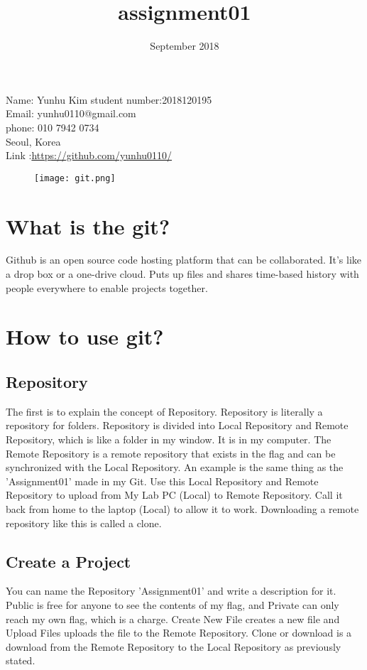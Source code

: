 \documentclass{article}
\title{assignment01}
\date{September 2018}
\begin{document}
	
	\maketitle
	Name: Yunhu Kim  student number:2018120195\\
	Email: yunhu0110@gmail.com\\ 
	phone: 010 7942 0734\\ 
	Seoul, Korea\\ 
	Link :\href{url}{https://github.com/yunhu0110/}\
\begin{figure}
	\centering
	\texttt{[image: git.png]}
\end{figure}
	
	\section{What is the git?}
	Github is an open source code hosting platform that can be collaborated. It's like a drop box or a one-drive cloud.
	Puts up files and shares time-based history with people everywhere to enable projects together.
	

	\section{How to use git?}
	
	\subsection{Repository}
	The first is to explain the concept of Repository. Repository is literally a repository for folders.
	Repository is divided into Local Repository and Remote Repository, which is like a folder in my window.
	It is in my computer. The Remote Repository is a remote repository that exists in the flag and can be synchronized with the Local Repository.
	An example is the same thing as the 'Assignment01' made in my Git.
	Use this Local Repository and Remote Repository to upload from My Lab PC (Local) to Remote Repository.
	Call it back from home to the laptop (Local) to allow it to work. Downloading a remote repository like this is called a clone.
	
	\subsection{Create a Project}
	You can name the Repository 'Assignment01' and write a description for it.
	Public is free for anyone to see the contents of my flag, and Private can only reach my own flag, which is a charge.
	Create New File creates a new file and Upload Files uploads the file to the Remote Repository.
	Clone or download is a download from the Remote Repository to the Local Repository as previously stated.
	
\end{document}
